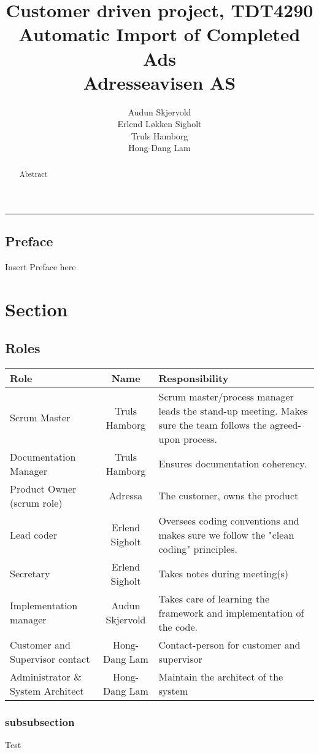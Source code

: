 \documentclass[12pt, a4paper]{article}
\title{\normalsize Customer driven project, TDT4290 \\ \LARGE \textbf{Automatic Import of Completed Ads} \normalsize \\Adresseavisen AS}
\author{Audun Skjervold \\ Erlend Løkken Sigholt \\ Truls Hamborg \\ Hong-Dang Lam}
\begin{document}
\maketitle
\newpage
\begin{abstract}
 
Abstract
 
\end{abstract}
 
\newpage
\hrule
\subsection*{Preface}
Insert Preface here
\newpage
\tableofcontents
\newpage
 
\section{Section}
\subsection{Roles}
\begin{center}
  \begin{tabular}{| l  c  b{5cm}|}
    \hline
    Role & Name & Responsibility \\ \hline 
    Scrum Master & Truls Hamborg &  Scrum master/process manager leads the stand-up meeting. Makes sure the team follows the agreed-upon process. \\ \hline
    Documentation Manager & Truls Hamborg &  Ensures documentation coherency. \\ \hline
    Product Owner (scrum role) & Adressa & The customer, owns the product\\ \hline
    Lead coder & Erlend Sigholt & Oversees coding conventions and makes sure we follow the "clean coding" principles. \\ \hline
    Secretary & Erlend Sigholt & Takes notes during meeting(s) \\ \hline
    Implementation manager & Audun Skjervold & Takes care of learning the framework and implementation of the code.\\ \hline
    Customer and Supervisor contact & Hong-Dang Lam & Contact-person for customer and supervisor \\ \hline
    Administrator \& System Architect & Hong-Dang Lam & Maintain the architect of the system \\
    \hline
  \end{tabular}
\end{center}
\subsubsection{subsubsection}
Test
 
\end{document}
